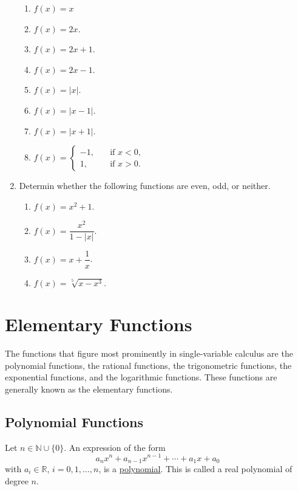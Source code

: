 \documentclass[11pt]{book}
\theoremstyle{break}
\theoremstyle{no_label}
\newcommand{\bbR}{\mathbb{R}}
\newcommand{\bbN}{\mathbb{N}}
\numberwithin{equation}{section}
\begin{document}
\begin{enumerate}[label=\arabic*.]
\begin{multicols}{2}
\begin{enumerate}
            \item $f(x)=x$
            \item $f(x)=2x$.
            \item $f(x)=2x+1$.
            \item $f(x)=2x-1$.
            \item $f(x)=|x|$.
            \item $f(x)=|x-1|$.
            \item $f(x)=|x+1|$.
            \item $f(x)=\left\{\begin{array}{rl}
                -1,\quad&\text{if $x<0$,}\\1,\quad&\text{if $x>0$}.
            \end{array}\right.$
        \end{enumerate}
    \end{multicols}
    \item Determin whether the following functions are even, odd, or neither.
    \begin{multicols}{2}
        \begin{enumerate}
            \item $f(x)=x^2+1$.
            \item $f(x)=\dfrac{x^2}{1-|x|}$.
            \item $f(x)=x+\dfrac{1}{x}$.
            \item $f(x)=\sqrt[5]{x-x^3}$.
        \end{enumerate}
    \end{multicols}
\end{enumerate}

\section{Elementary Functions}

The functions that figure most prominently in single-variable calculus are the polynomial functions, the rational functions, the trigonometric functions, the exponential functions, and the logarithmic functions. These functions are generally known as the elementary functions.

\subsection*{Polynomial Functions}

\begin{definition}[Polynomial]
    Let $n\in\bbN\cup\{0\}$. An expression of the form $$a_nx^n+a_{n-1}x^{n-1}+\cdots+a_1x+a_0$$ with $a_i\in\bbR$, $i=0, 1, \dots, n$, is a \underline{polynomial}. This is called a real polynomial of degree $n$.
\end{definition}
\end{document}
